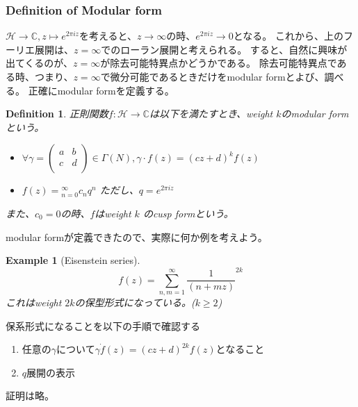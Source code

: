\documentclass{ujarticle}
\newtheorem{dfn}[thm]{Definition}
\newtheorem{ex}[thm]{Example}
\begin{document}
\subsubsection{Definition of Modular form}
\label{subs:Definition of Modular form}


$\mathcal{H} \to \mathbb{C}, z \mapsto  e^{2 \pi i z}$を考えると、$z \to \infty$の時、$e^{2 \pi i z} \to 0$となる。
これから、上のフーリエ展開は、$z = \infty$でのローラン展開と考えられる。
すると、自然に興味が出てくるのが、$z = \infty$が除去可能特異点かどうかである。
除去可能特異点である時、つまり、$z = \infty$で微分可能であるときだけをmodular formとよび、調べる。
正確にmodular formを定義する。
\begin{dfn}
  正則関数$f:\mathcal{H} \to \mathbb{C}$は以下を満たすとき、weight $k$のmodular formという。
  \begin{itemize}
    \item   $\forall  \gamma=
      \begin{pmatrix}
        a & b \\
        c & d \\
      \end{pmatrix}
      \in \Gamma(N),  \gamma \cdot f(z) = (cz + d)^{k}f(z)$
    \item $f(z) = \displaystyle_{n= 0}^{\infty}c_nq^n$ ただし、$q = e^{2 \pi i z}$
  \end{itemize}
  また、$c_0 = 0$の時、$f$はweight $k$ のcusp formという。
\end{dfn}

modular formが定義できたので、実際に何か例を考えよう。

\begin{ex}[Eisenstein series]
 \begin{equation*}
   f(z)=\sum_{n,m=1}^{ \infty}\frac{1}{(n+mz)}^{2k}
 \end{equation*}
これはweight $2k$の保型形式になっている。($k \ge 2$)
\end{ex}

保系形式になることを以下の手順で確認する
\begin{enumerate}
  \setlength{\parskip}{0cm} %
  \setlength{\itemsep}{0cm} %
  \item 任意の$\gamma$について$\gamma \dot f(z) = (cz+d)^{2k}f(z)$となること
  \item $q$展開の表示
\end{enumerate}
証明は略。

\end{document}
